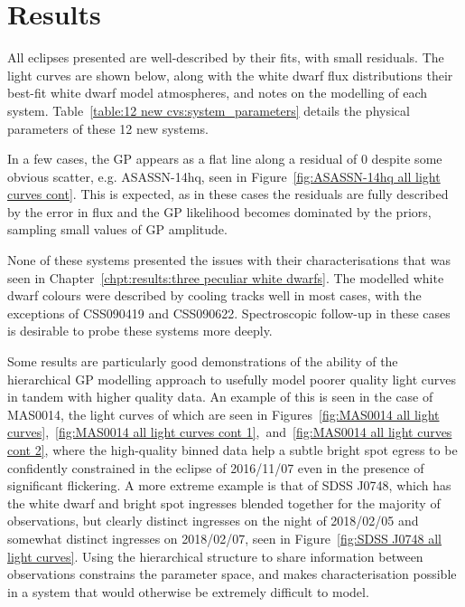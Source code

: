 \section{Results}
\label{sect:results:12 new CVs:results}

All eclipses presented are well-described by their fits, with small residuals. The light curves are shown below, along with the white dwarf flux distributions their best-fit white dwarf model atmospheres, and notes on the modelling of each system.
Table~\ref{table:12 new cvs:system_parameters} details the physical parameters of these 12 new systems.

In a few cases, the GP appears as a flat line along a residual of 0 despite some obvious scatter, e.g. ASASSN-14hq, seen in Figure~\ref{fig:ASASSN-14hq all light curves cont}. This is expected, as in these cases the residuals are fully described by the error in flux and the GP likelihood becomes dominated by the priors, sampling small values of GP amplitude.

None of these systems presented the issues with their characterisations that was seen in Chapter~\ref{chpt:results:three peculiar white dwarfs}. The modelled white dwarf colours were described by cooling tracks well in most cases, with the exceptions of CSS090419 and CSS090622. Spectroscopic follow-up in these cases is desirable to probe these systems more deeply.

Some results are particularly good demonstrations of the ability of the hierarchical GP modelling approach to usefully model poorer quality light curves in tandem with higher quality data.
An example of this is seen in the case of MAS0014, the light curves of which are seen in Figures~\ref{fig:MAS0014 all light curves},~\ref{fig:MAS0014 all light curves cont 1},~and~\ref{fig:MAS0014 all light curves cont 2}, where the high-quality binned data help a subtle bright spot egress to be confidently constrained in the eclipse of 2016/11/07 even in the presence of significant flickering.
A more extreme example is that of SDSS J0748, which has the white dwarf and bright spot ingresses blended together for the majority of observations, but clearly distinct ingresses on the night of 2018/02/05 and somewhat distinct ingresses on 2018/02/07, seen in Figure~\ref{fig:SDSS J0748 all light curves}.
Using the hierarchical structure to share information between observations constrains the parameter space, and makes characterisation possible in a system that would otherwise be extremely difficult to model.

